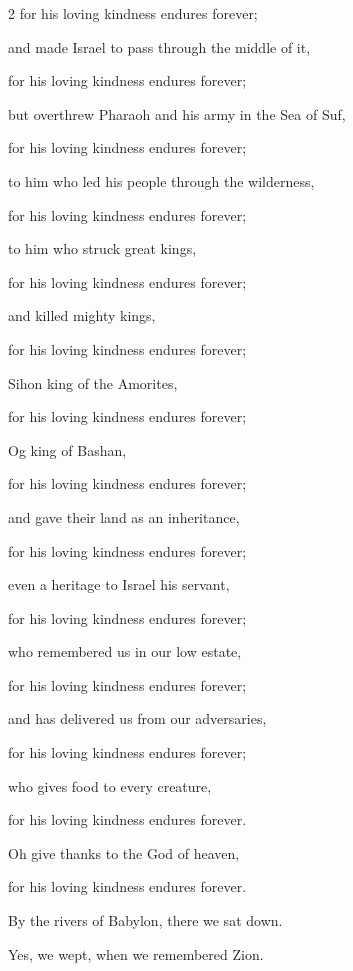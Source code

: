 \begin{multicols}{2}
	for his loving kindness endures forever;
	
	
	\myverse{}and made Israel to pass through the middle of it,
	
	for his loving kindness endures forever;
	
	
	\myverse{}but overthrew Pharaoh and his army in the Sea of Suf,
	
	for his loving kindness endures forever;
	
	
	\myverse{}to him who led his people through the wilderness,
	
	for his loving kindness endures forever;
	
	
	\myverse{}to him who struck great kings,
	
	for his loving kindness endures forever;
	
	
	\myverse{}and killed mighty kings,
	
	for his loving kindness endures forever;
	
	
	\myverse{}Sihon king of the Amorites,
	
	for his loving kindness endures forever;
	
	
	\myverse{}Og king of Bashan,
	
	for his loving kindness endures forever;
	
	
	\myverse{}and gave their land as an inheritance,
	
	for his loving kindness endures forever;
	
	
	\myverse{}even a heritage to Israel his servant,
	
	for his loving kindness endures forever;
	
	
	\myverse{}who remembered us in our low estate,
	
	for his loving kindness endures forever;
	
	
	\myverse{}and has delivered us from our adversaries,
	
	for his loving kindness endures forever;
	
	
	\myverse{}who gives food to every creature,
	
	for his loving kindness endures forever.
	
	
	\myverse{}Oh give thanks to the God of heaven,
	
	for his loving kindness endures forever.
	
	
	\mychapter{} \myverse*{}By the rivers of Babylon, there we sat down.
	
	\quad\quad\quad Yes, we wept, when we remembered Zion.
	

\end{multicols}
